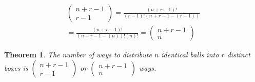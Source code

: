 \documentclass[11pt]{article}
\newtheorem{theorem}{Theorem}
\begin{document}
\begin{align*}
    \begin{pmatrix} n+r-1 \\ r-1 \end{pmatrix}
    =\frac{(n+r-1)!}{(r-1)!(n+r-1-(r-1))} \\
    =\frac{(n+r-1)!}{(n+r-1-(n))!(n)!}
    = \begin{pmatrix} n+r-1 \\ n \end{pmatrix}
\end{align*}
\begin{theorem}
    The number of ways to distribute $n$ identical balls into $r$ distinct boxes is $(\begin{smallmatrix} n+r-1 \\ r-1 \end{smallmatrix})$ or $(\begin{smallmatrix} n+r-1 \\ n \end{smallmatrix})$ ways.
\end{theorem}
\end{document}
